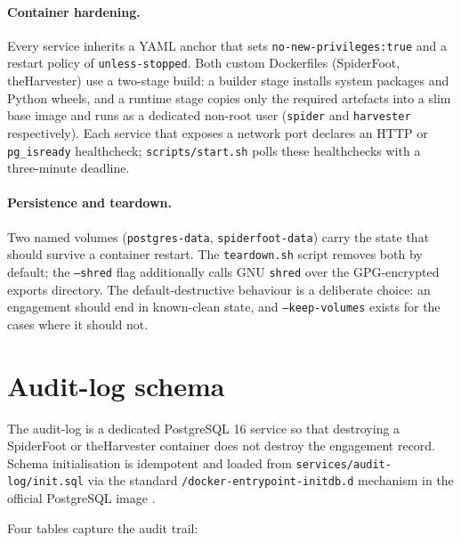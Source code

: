 \documentclass[conference,a4paper,10pt]{IEEEtran}
\begin{document}
\paragraph{Container hardening.}
Every service inherits a YAML anchor that sets
\verb|no-new-privileges:true| and a restart policy of
\verb|unless-stopped|. Both custom Dockerfiles (SpiderFoot,
theHarvester) use a two-stage build: a builder stage installs system
packages and Python wheels, and a runtime stage copies only the
required artefacts into a slim base image and runs as a dedicated
non-root user (\texttt{spider} and \texttt{harvester} respectively).
Each service that exposes a network port declares an HTTP or
\texttt{pg\_isready} healthcheck; \texttt{scripts/start.sh} polls these
healthchecks with a three-minute deadline.

\paragraph{Persistence and teardown.}
Two named volumes (\texttt{postgres-data}, \texttt{spiderfoot-data})
carry the state that should survive a container restart. The
\texttt{teardown.sh} script removes both by default; the
\texttt{--shred} flag additionally calls GNU \texttt{shred} over the
GPG-encrypted exports directory. The default-destructive behaviour is
a deliberate choice: an engagement should end in known-clean state,
and \texttt{--keep-volumes} exists for the cases where it should not.

\section{Audit-log schema}
\label{sec:audit}

The audit-log is a dedicated PostgreSQL 16 service so that destroying
a SpiderFoot or theHarvester container does not destroy the
engagement record. Schema initialisation is idempotent and loaded
from \texttt{services/audit-log/init.sql} via the standard
\texttt{/docker-entrypoint-initdb.d} mechanism in the official
PostgreSQL image \cite{postgresdocs}.

Four tables capture the audit trail:
\end{document}
